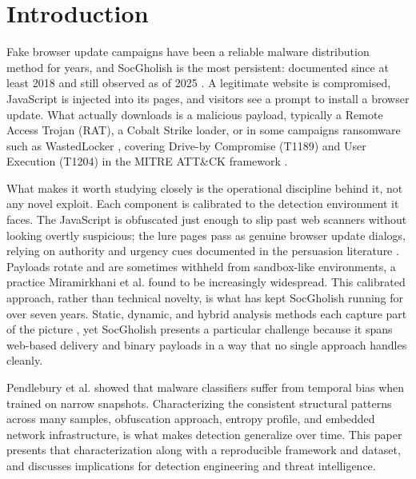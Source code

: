\documentclass[pdflatex,sn-mathphys-num]{sn-jnl}
\theoremstyle{thmstyleone}%
\theoremstyle{thmstyletwo}%
\theoremstyle{thmstylethree}%
\begin{document}
\section{Introduction}\label{sec:intro}

Fake browser update campaigns have been a reliable malware distribution method for years, and SocGholish is the most persistent: documented since at least 2018 and still observed as of 2025 \cite{proofpoint2022}. A legitimate website is compromised, JavaScript is injected into its pages, and visitors see a prompt to install a browser update. What actually downloads is a malicious payload, typically a Remote Access Trojan (RAT), a Cobalt Strike loader, or in some campaigns ransomware such as WastedLocker \cite{secureworks2020, mandiant2023}, covering Drive-by Compromise (T1189) and User Execution (T1204) in the MITRE ATT\&CK framework \cite{mitre2024}.

What makes it worth studying closely is the operational discipline behind it, not any novel exploit. Each component is calibrated to the detection environment it faces. The JavaScript is obfuscated just enough to slip past web scanners without looking overtly suspicious; the lure pages pass as genuine browser update dialogs, relying on authority and urgency cues documented in the persuasion literature \cite{cialdini2001, ferreira2015}. Payloads rotate and are sometimes withheld from sandbox-like environments, a practice Miramirkhani et al. \cite{miramirkhani2017} found to be increasingly widespread. This calibrated approach, rather than technical novelty, is what has kept SocGholish running for over seven years. Static, dynamic, and hybrid analysis methods each capture part of the picture \cite{gandotra2014, aslan2020}, yet SocGholish presents a particular challenge because it spans web-based delivery and binary payloads in a way that no single approach handles cleanly.

Pendlebury et al. \cite{pendlebury2019} showed that malware classifiers suffer from temporal bias when trained on narrow snapshots. Characterizing the consistent structural patterns across many samples, obfuscation approach, entropy profile, and embedded network infrastructure, is what makes detection generalize over time. This paper presents that characterization along with a reproducible framework and dataset, and discusses implications for detection engineering and threat intelligence.
\end{document}
